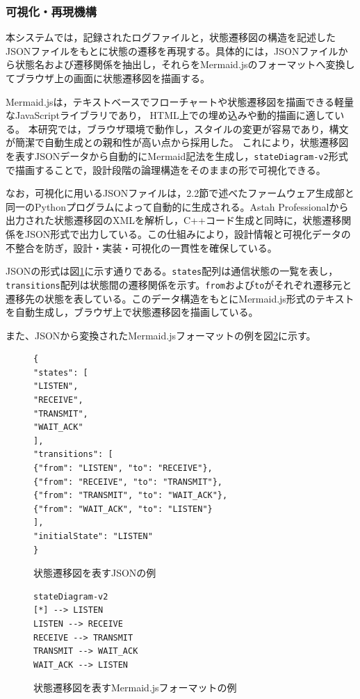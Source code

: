 \documentclass[technicalreport]{ieicej}
\begin{document}
\subsubsection{可視化・再現機構}
本システムでは，記録されたログファイルと，状態遷移図の構造を記述したJSONファイルをもとに状態の遷移を再現する。具体的には，JSONファイルから状態名および遷移関係を抽出し，それらをMermaid.jsのフォーマットへ変換してブラウザ上の画面に状態遷移図を描画する。

Mermaid.jsは，テキストベースでフローチャートや状態遷移図を描画できる軽量なJavaScriptライブラリであり，
HTML上での埋め込みや動的描画に適している\cite{mermaid}。
本研究では，ブラウザ環境で動作し，スタイルの変更が容易であり，構文が簡潔で自動生成との親和性が高い点から採用した。
これにより，状態遷移図を表すJSONデータから自動的にMermaid記法を生成し，\verb|stateDiagram-v2|形式\cite{mermaid-statediagram}で描画することで，設計段階の論理構造をそのままの形で可視化できる。


なお，可視化に用いるJSONファイルは，2.2節で述べたファームウェア生成部と同一のPythonプログラムによって自動的に生成される。Astah Professionalから出力された状態遷移図のXMLを解析し，C++コード生成と同時に，状態遷移関係をJSON形式で出力している。この仕組みにより，設計情報と可視化データの不整合を防ぎ，設計・実装・可視化の一貫性を確保している。

JSONの形式は図\ref{fig:json-structure}に示す通りである。\texttt{states}配列は通信状態の一覧を表し，\texttt{transitions}配列は状態間の遷移関係を示す。\texttt{from}および\texttt{to}がそれぞれ遷移元と遷移先の状態を表している。このデータ構造をもとにMermaid.js形式のテキストを自動生成し，ブラウザ上で状態遷移図を描画している。

また、JSONから変換されたMermaid.jsフォーマットの例を図\ref{fig:mermaid-example}に示す。
\begin{figure}[h]
\scriptsize
\centering
\begin{lstlisting}
{
"states": [
"LISTEN",
"RECEIVE",
"TRANSMIT",
"WAIT_ACK"
],
"transitions": [
{"from": "LISTEN", "to": "RECEIVE"},
{"from": "RECEIVE", "to": "TRANSMIT"},
{"from": "TRANSMIT", "to": "WAIT_ACK"},
{"from": "WAIT_ACK", "to": "LISTEN"}
],
"initialState": "LISTEN"
}
\end{lstlisting}
\caption{状態遷移図を表すJSONの例}
\label{fig:json-structure}
\end{figure}



\begin{figure}[h]
\scriptsize
\begin{lstlisting}
stateDiagram-v2
[*] --> LISTEN
LISTEN --> RECEIVE
RECEIVE --> TRANSMIT
TRANSMIT --> WAIT_ACK
WAIT_ACK --> LISTEN
\end{lstlisting}
\caption{状態遷移図を表すMermaid.jsフォーマットの例}
\label{fig:mermaid-example}
\end{figure}
\end{document}
